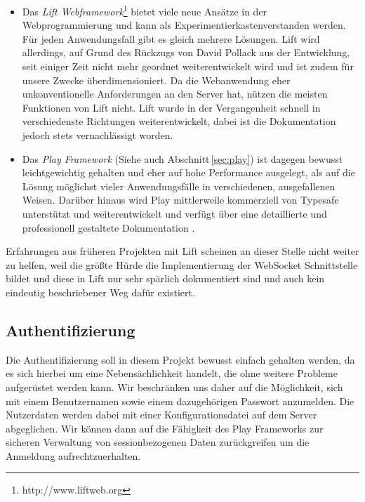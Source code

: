 \begin{itemize}

  \item Das \textit{Lift Webframework}\footnote{http://www.liftweb.org} bietet viele neue Ansätze in
der Webprogrammierung und kann als \glqq Experimentierkasten\grqq verstanden werden. Für jeden
Anwendungsfall gibt es gleich mehrere Lösungen. Lift wird allerdings, auf Grund des Rückzugs von
David Pollack aus der Entwicklung, seit einiger Zeit nicht mehr geordnet weiterentwickelt wird und
ist zudem für unsere Zwecke überdimensioniert. Da die Webanwendung eher unkonventionelle
Anforderungen an den Server hat, nützen die meisten Funktionen von Lift nicht. Lift wurde in der
Vergangenheit schnell in verschiedenste Richtungen weiterentwickelt, dabei ist die Dokumentation
jedoch stets vernachlässigt worden.


  \item Das \textit{Play Framework} (Siehe auch Abschnitt\,\ref{sec:play}) ist dagegen bewusst
leichtgewichtig gehalten und eher auf hohe Performance ausgelegt, als auf die Lösung möglichst
vieler Anwendungsfälle in verschiedenen, ausgefallenen Weisen. Darüber hinaus wird Play mittlerweile
kommerziell von Typesafe unterstützt und weiterentwickelt und verfügt über eine detaillierte und
professionell gestaltete Dokumentation \cite{play}.

\end{itemize}

Erfahrungen aus früheren Projekten mit Lift scheinen an dieser Stelle nicht weiter zu helfen, weil
die größte Hürde die Implementierung der WebSocket Schnittstelle bildet und diese in Lift nur sehr
spärlich dokumentiert sind und auch kein eindeutig beschriebener Weg dafür existiert.

\subsection{Authentifizierung}

Die Authentifizierung soll in diesem Projekt bewusst einfach gehalten werden, da es sich hierbei um
eine Nebensächlichkeit handelt, die ohne weitere Probleme aufgerüstet werden kann. Wir beschränken
uns daher auf die Möglichkeit, sich mit einem Benutzernamen sowie einem dazugehörigen Passwort
anzumelden. Die Nutzerdaten werden dabei mit einer Konfigurationsdatei auf dem Server abgeglichen.
Wir können dann auf die Fähigkeit des Play Frameworks zur sicheren Verwaltung von sessionbezogenen
Daten zurückgreifen um die Anmeldung aufrechtzuerhalten.

